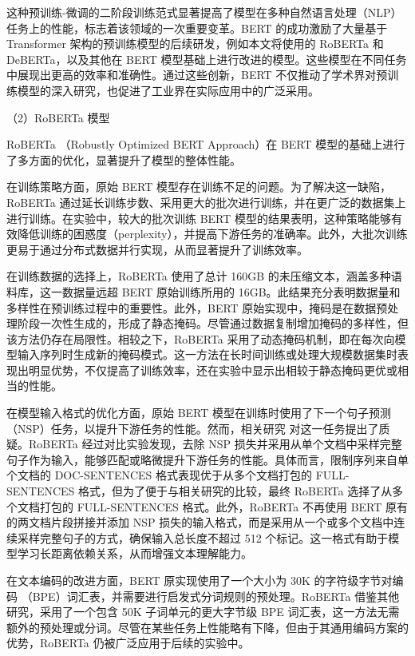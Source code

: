 这种预训练-微调的二阶段训练范式显著提高了模型在多种自然语言处理（NLP）任务上的性能，标志着该领域的一次重要变革。BERT 的成功激励了大量基于 Transformer 架构的预训练模型的后续研发，例如本文将使用的 RoBERTa 和 DeBERTa，以及其他在 BERT 模型基础上进行改进的模型。这些模型在不同任务中展现出更高的效率和准确性。通过这些创新，BERT 不仅推动了学术界对预训练模型的深入研究，也促进了工业界在实际应用中的广泛采用。

（2）RoBERTa 模型
\label{sec:method-pretrain-roberta}

RoBERTa \cite{liu_roberta_2019}（Robustly Optimized BERT Approach）在 BERT \cite{devlin_bert_2019} 模型的基础上进行了多方面的优化，显著提升了模型的整体性能。

在训练策略方面，原始 BERT 模型存在训练不足的问题。为了解决这一缺陷，RoBERTa 通过延长训练步数、采用更大的批次进行训练，并在更广泛的数据集上进行训练。在实验中，较大的批次训练 BERT 模型的结果表明，这种策略能够有效降低训练的困惑度（perplexity），并提高下游任务的准确率。此外，大批次训练更易于通过分布式数据并行实现，从而显著提升了训练效率。

在训练数据的选择上，RoBERTa 使用了总计 160GB 的未压缩文本，涵盖多种语料库，这一数据量远超 BERT 原始训练所用的 16GB。此结果充分表明数据量和多样性在预训练过程中的重要性。此外，BERT 原始实现中，掩码是在数据预处理阶段一次性生成的，形成了静态掩码。尽管通过数据复制增加掩码的多样性，但该方法仍存在局限性。相较之下，RoBERTa 采用了动态掩码机制，即在每次向模型输入序列时生成新的掩码模式。这一方法在长时间训练或处理大规模数据集时表现出明显优势，不仅提高了训练效率，还在实验中显示出相较于静态掩码更优或相当的性能。

在模型输入格式的优化方面，原始 BERT 模型在训练时使用了下一个句子预测（NSP）任务，以提升下游任务的性能。然而，相关研究 \cite{Lample2019CrosslingualLM, Yang2019XLNetGA, Joshi2019SpanBERTIP} 对这一任务提出了质疑。RoBERTa 经过对比实验发现，去除 NSP 损失并采用从单个文档中采样完整句子作为输入，能够匹配或略微提升下游任务的性能。具体而言，限制序列来自单个文档的 DOC-SENTENCES 格式表现优于从多个文档打包的 FULL-SENTENCES 格式，但为了便于与相关研究的比较，最终 RoBERTa 选择了从多个文档打包的 FULL-SENTENCES 格式。此外，RoBERTa 不再使用 BERT 原有的两文档片段拼接并添加 NSP 损失的输入格式，而是采用从一个或多个文档中连续采样完整句子的方式，确保输入总长度不超过 512 个标记。这一格式有助于模型学习长距离依赖关系，从而增强文本理解能力。

在文本编码的改进方面，BERT 原实现使用了一个大小为 30K 的字符级字节对编码 \cite{BPE}（BPE）词汇表，并需要进行启发式分词规则的预处理。RoBERTa 借鉴其他研究，采用了一个包含 50K 子词单元的更大字节级 BPE 词汇表，这一方法无需额外的预处理或分词。尽管在某些任务上性能略有下降，但由于其通用编码方案的优势，RoBERTa 仍被广泛应用于后续的实验中。

